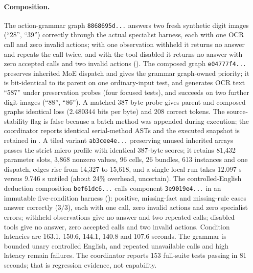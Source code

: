 \documentclass[11pt]{article}
\begin{document}
\paragraph{Composition.} The action-grammar graph \texttt{8868695d...} answers two fresh synthetic
digit images (``28'', ``39'') correctly through the actual specialist harness, each with one OCR
call and zero invalid actions; with one observation withheld it returns no answer and repeats the
call twice, and with the tool disabled it returns no answer with zero accepted calls and two
invalid actions (). The composed graph
\texttt{e04777f4...} preserves inherited MoE dispatch and gives the grammar graph-owned priority;
it is bit-identical to its parent on one ordinary-input test, and generates OCR text ``587'' under preservation probes (four focused tests), and succeeds on two further digit
images (``88'', ``86''). A matched 387-byte probe gives parent and composed graphs identical loss
(2.480344 bits per byte) and 208 correct tokens. The source-stability flag is false because a
batch method was appended during execution; the coordinator reports identical serial-method ASTs
and the executed snapshot is retained in .
A tiled variant \texttt{ab3cee4e...} preserving unused inherited arrays passes the strict micro
profile with identical 387-byte scores; it retains 81{,}432 parameter slots, 3{,}868 nonzero
values, 96 cells, 26 bundles, 613 instances and one dispatch, edges rise from 14{,}327 to 15{,}618,
and a single local run takes 12.097 s versus 9.746 s untiled (about 24\% overhead, uncertain).
The controlled-English deduction composition \texttt{bef61dc6...} calls component
\texttt{3e9019e4...} in an immutable five-condition harness
(): positive, missing-fact and
missing-rule cases answer correctly (3/3), each with one call, zero invalid actions and zero
specialist errors; withheld observations give no answer and two repeated calls; disabled tools give
no answer, zero accepted calls and two invalid actions. Condition latencies are 163.1, 150.6, 144.1,
140.8 and 107.6 seconds. The grammar is bounded unary controlled English, and repeated unavailable
calls and high latency remain failures. The coordinator reports 153 full-suite tests passing in
81 seconds; that is regression evidence, not capability.
\end{document}
